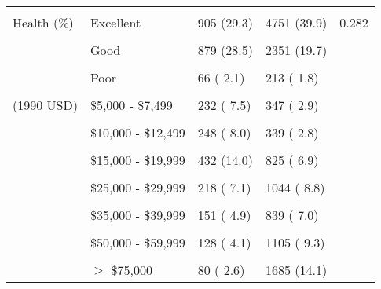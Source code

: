 \documentclass{article}
\begin{document}
\begin{table}[h!]
{\begin{tabular}{lllll}
\cellcolor{gray!6}{} & \cellcolor{gray!6}{Other nonwhite} & \cellcolor{gray!6}{124 ( 4.0)} & \cellcolor{gray!6}{166 ( 1.4)} & \cellcolor{gray!6}{}\\
Health (\%) & Excellent & 905 (29.3) & 4751 (39.9) & 0.282\\
\cellcolor{gray!6}{} & \cellcolor{gray!6}{Very good} & \cellcolor{gray!6}{1012 (32.8)} & \cellcolor{gray!6}{4056 (34.0)} & \cellcolor{gray!6}{}\\
\addlinespace
 & Good & 879 (28.5) & 2351 (19.7) & \\
\cellcolor{gray!6}{} & \cellcolor{gray!6}{Fair} & \cellcolor{gray!6}{226 ( 7.3)} & \cellcolor{gray!6}{541 ( 4.5)} & \cellcolor{gray!6}{}\\
 & Poor & 66 ( 2.1) & 213 ( 1.8) & \\
\cellcolor{gray!6}{Inflation adjusted income (\%)} & \cellcolor{gray!6}{\$0 - \$4,999} & \cellcolor{gray!6}{403 (13.1)} & \cellcolor{gray!6}{504 ( 4.2)} & \cellcolor{gray!6}{0.886}\\
(1990 USD) & \$5,000 - \$7,499 & 232 ( 7.5) & 347 ( 2.9) & \\
\cellcolor{gray!6}{} & \cellcolor{gray!6}{\$7,499 - \$9,999} & \cellcolor{gray!6}{201 ( 6.5)} & \cellcolor{gray!6}{357 ( 3.0)} & \cellcolor{gray!6}{}\\
 & \$10,000 - \$12,499 & 248 ( 8.0) & 339 ( 2.8) & \\
\cellcolor{gray!6}{} & \cellcolor{gray!6}{\$12,500 - \$14,999} & \cellcolor{gray!6}{267 ( 8.6)} & \cellcolor{gray!6}{355 ( 3.0)} & \cellcolor{gray!6}{}\\
 & \$15,000 - \$19,999 & 432 (14.0) & 825 ( 6.9) & \\
\cellcolor{gray!6}{} & \cellcolor{gray!6}{\$20,000 - \$24,999} & \cellcolor{gray!6}{295 ( 9.6)} & \cellcolor{gray!6}{973 ( 8.2)} & \cellcolor{gray!6}{}\\
\addlinespace
 & \$25,000 - \$29,999 & 218 ( 7.1) & 1044 ( 8.8) & \\
\cellcolor{gray!6}{} & \cellcolor{gray!6}{\$30,000 - \$34,999} & \cellcolor{gray!6}{169 ( 5.5)} & \cellcolor{gray!6}{876 ( 7.4)} & \cellcolor{gray!6}{}\\
 & \$35,000 - \$39,999 & 151 ( 4.9) & 839 ( 7.0) & \\
\cellcolor{gray!6}{} & \cellcolor{gray!6}{\$40,000 - \$49,999} & \cellcolor{gray!6}{175 ( 5.7)} & \cellcolor{gray!6}{1452 (12.2)} & \cellcolor{gray!6}{}\\
 & \$50,000 - \$59,999 & 128 ( 4.1) & 1105 ( 9.3) & \\
\cellcolor{gray!6}{} & \cellcolor{gray!6}{\$60,000 - \$74,999} & \cellcolor{gray!6}{89 ( 2.9)} & \cellcolor{gray!6}{1211 (10.2)} & \cellcolor{gray!6}{}\\
 & $\geq$ \$75,000  & 80 ( 2.6) & 1685 (14.1) & \\
\bottomrule
\end{tabular}}
\end{table}
\end{document}
